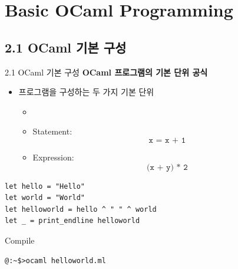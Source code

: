 \documentclass[10pt]{beamer}
\begin{document}

	\section{Basic OCaml Programming}
	\subsection{2.1 OCaml 기본 구성}
	\begin{frame}{2.1 OCaml 기본 구성}
		\textbf{OCaml 프로그램의 기본 단위 공식}
		
		\begin{itemize}
			\item 프로그램을 구성하는 두 가지 기본 단위
			\begin{itemize}
				\item[]
				\item[] Statement: \[
				\texttt{x = x + 1}
				\]
				\item[] Expression: \[
				\texttt{(x + y) * 2}
				\]
			\end{itemize}
		\end{itemize}
	\end{frame}

\begin{lstlisting}[style=ocaml]
let hello = "Hello"
let world = "World"
let helloworld = hello ^ " " ^ world
let _ = print_endline helloworld
\end{lstlisting}

Compile
\begin{lstlisting}[style=zsh]
@:~$>ocaml helloworld.ml
\end{lstlisting}
\end{document}

